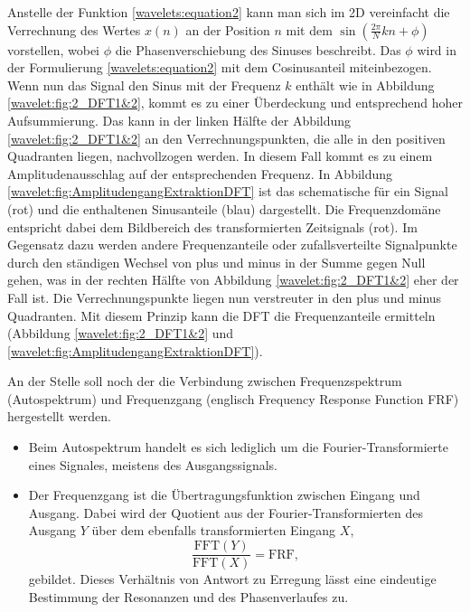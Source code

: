 Anstelle der Funktion \eqref{wavelets:equation2} kann man sich im 2D vereinfacht die Verrechnung des Wertes $x(n)$ an der Position $n$ mit dem $\sin(\frac{2\pi}{N}kn+\phi)$ vorstellen, wobei $\phi$ die Phasenverschiebung des Sinuses beschreibt. Das $\phi$  wird in der Formulierung \eqref{wavelets:equation2} mit dem Cosinusanteil miteinbezogen. Wenn nun das Signal den Sinus mit der Frequenz $k$ enthält wie in Abbildung \ref{wavelet:fig:2_DFT1&2}, kommt es zu einer Überdeckung und entsprechend hoher Aufsummierung. Das kann in der linken Hälfte der Abbildung \ref{wavelet:fig:2_DFT1&2} an den Verrechnungspunkten, die alle in den positiven Quadranten liegen, nachvollzogen werden. In diesem Fall kommt es zu einem Amplitudenausschlag auf der entsprechenden Frequenz. In Abbildung \ref{wavelet:fig:AmplitudengangExtraktionDFT} ist das schematische für ein Signal (rot) und die enthaltenen Sinusanteile (blau) dargestellt. Die Frequenzdomäne entspricht dabei dem Bildbereich des transformierten Zeitsignals (rot). Im Gegensatz dazu werden andere Frequenzanteile oder zufallsverteilte Signalpunkte durch den ständigen Wechsel von plus und minus in der Summe gegen Null gehen, was in der rechten Hälfte von Abbildung \ref{wavelet:fig:2_DFT1&2} eher der Fall ist. Die Verrechnungspunkte liegen nun verstreuter in den plus und minus Quadranten. Mit diesem Prinzip kann die DFT die Frequenzanteile ermitteln (Abbildung \ref{wavelet:fig:2_DFT1&2} und \ref{wavelet:fig:AmplitudengangExtraktionDFT}).

An der Stelle soll noch der die Verbindung zwischen Frequenzspektrum (Autospektrum) und Frequenzgang (englisch Frequency Response Function FRF) hergestellt werden.

\begin{itemize}
	\item Beim Autospektrum handelt es sich lediglich um die Fourier-Transformierte eines Signales, meistens des Ausgangssignals.
	\item Der Frequenzgang ist die Übertragungsfunktion zwischen Eingang und Ausgang. Dabei wird der Quotient aus der Fourier-Transformierten des Ausgang $Y$ über dem ebenfalls transformierten Eingang $X$, \[\frac{\text{FFT}(Y)}{\text{FFT}(X)} = \text{FRF},\] gebildet.
	Dieses Verhältnis von Antwort zu Erregung lässt eine eindeutige Bestimmung der Resonanzen und des Phasenverlaufes zu.
\end{itemize}


